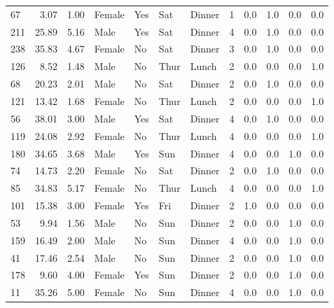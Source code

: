 \documentclass[
  letterpaper,
  DIV=11,
  numbers=noendperiod]{scrreprt}
\begin{document}
\begin{tabular}{lrrllllrrrrr}
67  &        3.07 &  1.00 &  Female &    Yes &   Sat &  Dinner &     1 &      0.0 &      1.0 &      0.0 &       0.0 \\
211 &       25.89 &  5.16 &    Male &    Yes &   Sat &  Dinner &     4 &      0.0 &      1.0 &      0.0 &       0.0 \\
238 &       35.83 &  4.67 &  Female &     No &   Sat &  Dinner &     3 &      0.0 &      1.0 &      0.0 &       0.0 \\
126 &        8.52 &  1.48 &    Male &     No &  Thur &   Lunch &     2 &      0.0 &      0.0 &      0.0 &       1.0 \\
68  &       20.23 &  2.01 &    Male &     No &   Sat &  Dinner &     2 &      0.0 &      1.0 &      0.0 &       0.0 \\
121 &       13.42 &  1.68 &  Female &     No &  Thur &   Lunch &     2 &      0.0 &      0.0 &      0.0 &       1.0 \\
56  &       38.01 &  3.00 &    Male &    Yes &   Sat &  Dinner &     4 &      0.0 &      1.0 &      0.0 &       0.0 \\
119 &       24.08 &  2.92 &  Female &     No &  Thur &   Lunch &     4 &      0.0 &      0.0 &      0.0 &       1.0 \\
180 &       34.65 &  3.68 &    Male &    Yes &   Sun &  Dinner &     4 &      0.0 &      0.0 &      1.0 &       0.0 \\
74  &       14.73 &  2.20 &  Female &     No &   Sat &  Dinner &     2 &      0.0 &      1.0 &      0.0 &       0.0 \\
85  &       34.83 &  5.17 &  Female &     No &  Thur &   Lunch &     4 &      0.0 &      0.0 &      0.0 &       1.0 \\
101 &       15.38 &  3.00 &  Female &    Yes &   Fri &  Dinner &     2 &      1.0 &      0.0 &      0.0 &       0.0 \\
53  &        9.94 &  1.56 &    Male &     No &   Sun &  Dinner &     2 &      0.0 &      0.0 &      1.0 &       0.0 \\
159 &       16.49 &  2.00 &    Male &     No &   Sun &  Dinner &     4 &      0.0 &      0.0 &      1.0 &       0.0 \\
41  &       17.46 &  2.54 &    Male &     No &   Sun &  Dinner &     2 &      0.0 &      0.0 &      1.0 &       0.0 \\
178 &        9.60 &  4.00 &  Female &    Yes &   Sun &  Dinner &     2 &      0.0 &      0.0 &      1.0 &       0.0 \\
11  &       35.26 &  5.00 &  Female &     No &   Sun &  Dinner &     4 &      0.0 &      0.0 &      1.0 &       0.0 \\

\end{tabular}
\end{document}
